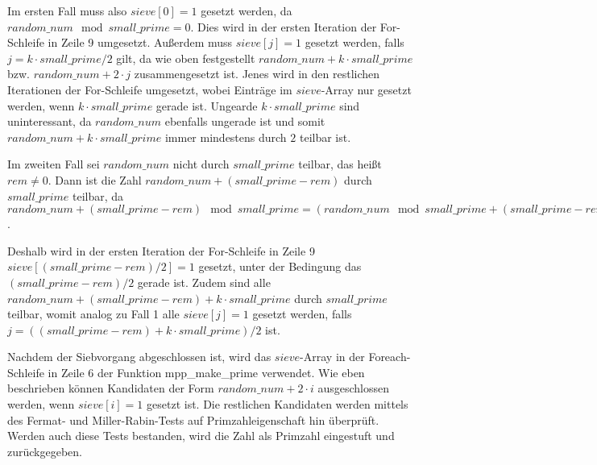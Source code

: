 Im ersten Fall muss also $sieve[0] = 1$ gesetzt werden, da $random\_num \mod small\_prime = 0$.
Dies wird in der ersten Iteration der For-Schleife in Zeile 9 umgesetzt.
Außerdem muss $sieve[j] = 1$ gesetzt werden, falls $j = k \cdot small\_prime / 2$ gilt, da wie oben festgestellt $random\_num + k \cdot small\_prime$ bzw. $random\_num + 2 \cdot j$ zusammengesetzt ist.
Jenes wird in den restlichen Iterationen der For-Schleife umgesetzt, wobei Einträge im $sieve$-Array nur gesetzt werden, wenn $k \cdot small\_prime$ gerade ist.
Ungearde $k \cdot small\_prime$ sind uninteressant, da $random\_num$ ebenfalls ungerade ist und somit $random\_num + k \cdot small\_prime$ immer mindestens durch $2$ teilbar ist.

Im zweiten Fall sei $random\_num$ nicht durch $small\_prime$ teilbar, das heißt $rem \neq 0$.
Dann ist die Zahl $random\_num + (small\_prime - rem)$ durch $small\_prime$ teilbar, da $random\_num + (small\_prime - rem) \mod small\_prime = (random\_num \mod small\_prime + (small\_prime - rem)) \mod small\_prime = (rem + (small\_prime - rem)) = 0$.

Deshalb wird in der ersten Iteration der For-Schleife in Zeile 9 $sieve[(small\_prime - rem)/2] = 1$ gesetzt, unter der Bedingung das $(small\_prime - rem)/2$ gerade ist.
Zudem sind alle $random\_num + (small\_prime - rem) + k \cdot small\_prime$ durch $small\_prime$ teilbar, womit analog zu Fall 1 alle $sieve[j] = 1$ gesetzt werden, falls $j = ((small\_prime - rem) + k \cdot small\_prime) / 2$ ist.



\begin{algorithm}[h]
\DontPrintSemicolon
\caption{Pseudo-Code für mpp_sieve in Mozilla NSS}
\label{alg:sievePrimeGenerationNSS}
\end{algorithm}

Nachdem der Siebvorgang abgeschlossen ist, wird das $sieve$-Array in der Foreach-Schleife in Zeile 6 der Funktion mpp_make_prime verwendet.
Wie eben beschrieben können Kandidaten der Form $random\_num + 2 \cdot i$ ausgeschlossen werden, wenn $sieve[i] = 1$ gesetzt ist.
Die restlichen Kandidaten werden mittels des Fermat- und Miller-Rabin-Tests auf Primzahleigenschaft hin überprüft.
Werden auch diese Tests bestanden, wird die Zahl als Primzahl eingestuft und zurückgegeben.

